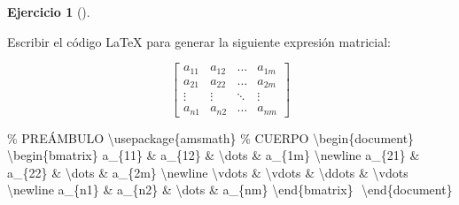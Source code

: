 \documentclass[
  a4paper,
]{scrreport}
\newenvironment{Shaded}{\begin{snugshade}}{\end{snugshade}}
\newcommand{\BuiltInTok}[1]{\textcolor[rgb]{0.00,0.23,0.31}{#1}}
\newcommand{\CommentTok}[1]{\textcolor[rgb]{0.37,0.37,0.37}{#1}}
\newcommand{\ExtensionTok}[1]{\textcolor[rgb]{0.00,0.23,0.31}{#1}}
\newcommand{\KeywordTok}[1]{\textcolor[rgb]{0.00,0.23,0.31}{#1}}
\newcommand{\NormalTok}[1]{\textcolor[rgb]{0.00,0.23,0.31}{#1}}
\newcommand{\SpecialCharTok}[1]{\textcolor[rgb]{0.37,0.37,0.37}{#1}}
\newcommand{\SpecialStringTok}[1]{\textcolor[rgb]{0.13,0.47,0.30}{#1}}
\theoremstyle{definition}
\newtheorem{exercise}{Ejercicio}[chapter]
\theoremstyle{remark}
\begin{document}
\begin{exercise}[]\protect\hypertarget{exr-matrices-basicas}{}\label{exr-matrices-basicas}

Escribir el código LaTeX para generar la siguiente expresión matricial:

\[
\begin{bmatrix}
a_{11} & a_{12} & \dots & a_{1m} \\
a_{21} & a_{22} & \dots & a_{2m} \\
\vdots & \vdots & \ddots & \vdots \\
a_{n1} & a_{n2} & \dots & a_{nm}
\end{bmatrix}
\]

\end{exercise}

\begin{tcolorbox}[enhanced jigsaw, left=2mm, colbacktitle=quarto-callout-tip-color!10!white, toprule=.15mm, coltitle=black, leftrule=.75mm, arc=.35mm, colback=white, opacitybacktitle=0.6, rightrule=.15mm, colframe=quarto-callout-tip-color-frame, title=\textcolor{quarto-callout-tip-color}{\faLightbulb}\hspace{0.5em}{Solución}, bottomrule=.15mm, breakable, opacityback=0, bottomtitle=1mm, toptitle=1mm, titlerule=0mm]

\begin{Shaded}
\begin{Highlighting}[]
\CommentTok{\% PREÁMBULO}
\BuiltInTok{\textbackslash{}usepackage}\NormalTok{\{}\ExtensionTok{amsmath}\NormalTok{\}}
\CommentTok{\% CUERPO}
\KeywordTok{\textbackslash{}begin}\NormalTok{\{}\ExtensionTok{document}\NormalTok{\}}
\SpecialStringTok{$$}
\KeywordTok{\textbackslash{}begin}\NormalTok{\{}\ExtensionTok{bmatrix}\NormalTok{\}}
\SpecialStringTok{a\_\{11\} \& a\_\{12\} \& }\SpecialCharTok{\textbackslash{}dots}\SpecialStringTok{ \& a\_\{1m\} }\SpecialCharTok{\textbackslash{}newline}
\SpecialStringTok{a\_\{21\} \& a\_\{22\} \& }\SpecialCharTok{\textbackslash{}dots}\SpecialStringTok{ \& a\_\{2m\} }\SpecialCharTok{\textbackslash{}newline}
\SpecialCharTok{\textbackslash{}vdots}\SpecialStringTok{ \& }\SpecialCharTok{\textbackslash{}vdots}\SpecialStringTok{ \& }\SpecialCharTok{\textbackslash{}ddots}\SpecialStringTok{ \& }\SpecialCharTok{\textbackslash{}vdots}\SpecialStringTok{ }\SpecialCharTok{\textbackslash{}newline}
\SpecialStringTok{a\_\{n1\} \& a\_\{n2\} \& }\SpecialCharTok{\textbackslash{}dots}\SpecialStringTok{ \& a\_\{nm\}}
\KeywordTok{\textbackslash{}end}\NormalTok{\{}\ExtensionTok{bmatrix}\NormalTok{\}}
\SpecialStringTok{$$}
\KeywordTok{\textbackslash{}end}\NormalTok{\{}\ExtensionTok{document}\NormalTok{\}}
\end{Highlighting}
\end{Shaded}

\end{tcolorbox}
\end{document}
